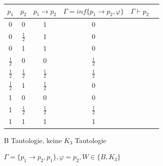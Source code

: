 \documentclass[10pt, a4paper]{exam}
\newcommand{\cmark}{\ding{51}}
\newcommand{\xmark}{\ding{55}}
\begin{document}
\begin{questions}
\begin{parts}
\begin{subparts}
            \begin{solution}

                \begin{tabular}{c|c|c|c|c|c}
                    $p_1$         & $p_2$         & $p_1\rightarrow p_2$ & $\Gamma= inf\{p_1\rightarrow p_2, \varphi\}$ & $\Gamma\vdash p_2$ \\\hline
                    0             & 0             & 1                    & 0                                            & \cmark             \\
                    0             & $\frac{1}{2}$ & 1                    & 0                                            & \xmark             \\
                    0             & 1             & 1                    & 0                                            & \cmark             \\
                    $\frac{1}{2}$ & 0             & 0                    & $\frac{1}{2}$                                & \xmark             \\
                    $\frac{1}{2}$ & $\frac{1}{2}$ & $\frac{1}{2}$        & $\frac{1}{2}$                                & \cmark             \\
                    $\frac{1}{2}$ & 1             & $\frac{1}{2}$        & 0                                            & \cmark             \\
                    1             & 0             & 0                    & 0                                            & \cmark             \\
                    1             & $\frac{1}{2}$ & $\frac{1}{2}$        & $\frac{1}{2}$                                & \cmark             \\
                    1             & 1             & 1                    & 1                                            & \cmark
                \end{tabular}

                B Tautologie, keine $K_3$ Tautologie
            \end{solution}

            \subpart $\Gamma=\{p_1\rightarrow p_2, p_1\}, \varphi=p_2, W\in\{B,K_3\}$
            \begin{solution}


\end{solution}
\end{subparts}
\end{parts}
\end{questions}
\end{document}

